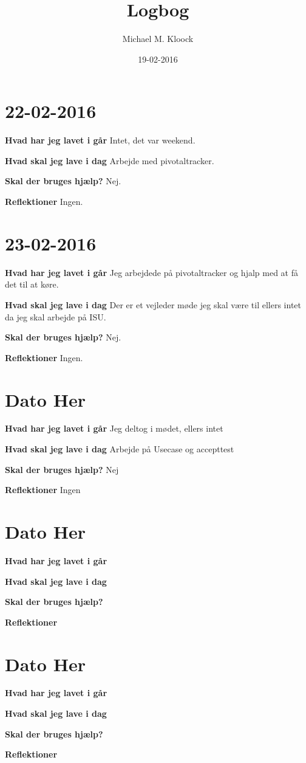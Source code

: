 \documentclass{article}
\title{Logbog}
\author{Michael M. Kloock}
\date{19-02-2016}
\begin{document}
	\maketitle
	\tableofcontents
	
	\section{22-02-2016}
	
	\textbf{Hvad har jeg lavet i går}	
	\textnormal Intet, det var weekend.	
	
	\textbf{Hvad skal jeg lave i dag}	
	\textnormal Arbejde med pivotaltracker.	
	
	\textbf{Skal der bruges hjælp?}	
	\textnormal Nej.
	
	\textbf{Reflektioner}	
	\textnormal Ingen.
	
	\section{23-02-2016}
	
	\textbf{Hvad har jeg lavet i går}	
	\textnormal Jeg arbejdede på pivotaltracker og hjalp med at få det til at køre.	
	
	\textbf{Hvad skal jeg lave i dag}	
	\textnormal Der er et vejleder møde jeg skal være til ellers intet da jeg skal arbejde på ISU.
	
	\textbf{Skal der bruges hjælp?}
	\textnormal Nej.
	
	\textbf{Reflektioner}	
	\textnormal Ingen.
	
	\section{Dato Her}
	
	\textbf{Hvad har jeg lavet i går} Jeg deltog i mødet, ellers intet
	
	\textbf{Hvad skal jeg lave i dag} Arbejde på Usecase og accepttest
	
	\textbf{Skal der bruges hjælp?} Nej
	
	\textbf{Reflektioner} Ingen
	
	\section{Dato Her}
	
	\textbf{Hvad har jeg lavet i går}
	
	\textbf{Hvad skal jeg lave i dag}
	
	\textbf{Skal der bruges hjælp?}
	
	\textbf{Reflektioner}
	
	\section{Dato Her}
	
	\textbf{Hvad har jeg lavet i går}
	
	\textbf{Hvad skal jeg lave i dag}
	
	\textbf{Skal der bruges hjælp?}
	
	\textbf{Reflektioner}
	
\end{document}
